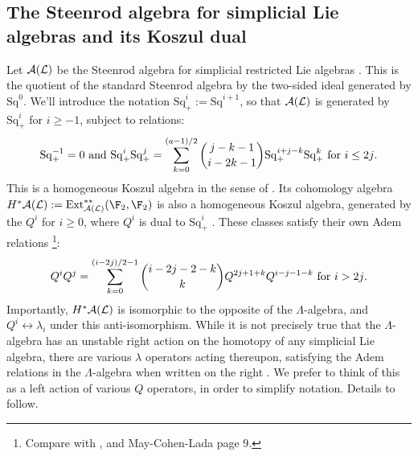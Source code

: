 \documentclass[11pt]{article}
\newcommand{\LambdaOp}{Q}
\newcommand{\SqShift}{\Sq_{+}}
\newcommand{\Sq}{\mathrm{Sq}}
\newcommand{\LieSteen}{\calA(\calL)}
\begin{document}
\begin{SteenrodAlgebrasAndTheirKoszulDuals}
\subsection*{The Steenrod algebra for simplicial Lie algebras and its Koszul dual}
Let  $\LieSteen$ be the Steenrod algebra for simplicial restricted Lie algebras \cite[\S7]{PriddySimplicialLie.pdf}. This is the quotient of the standard Steenrod algebra by the two-sided ideal generated by $\Sq^0$. We'll introduce the notation $\SqShift^i:=\Sq^{i+1}$, so that $\LieSteen$ is generated by $\SqShift^i$ for $i\geq-1$, subject to relations:
\[\SqShift^{-1}=0\textup{ and }\SqShift^i\SqShift^j=\sum_{k=0}^{(a-1)/2}{j-k-1\choose i-2k-1}\SqShift^{i+j-k}\SqShift^k\textup{\ for $i\leq2j$.}\]
This is a homogeneous Koszul algebra in the sense of \cite{PriddyKoszul.pdf}. Its cohomology algebra $H^*\LieSteen:=\Ext_{\LieSteen}^{**}(\F_2,\F_2)$ is also a homogeneous Koszul algebra, generated by the $\LambdaOp^i$ for $i\geq0$, where $\LambdaOp^i$ is dual to $\SqShift^i$ \cite[\S8]{PriddySimplicialLie.pdf}. These classes satisfy their own Adem relations%
\footnote{Compare with \cite[p.143]{Miller-infDeloopSS.pdf}, and May-Cohen-Lada page 9.}:
\[\LambdaOp^i\LambdaOp^j=\sum_{k=0}^{(i-2j)/2-1}{i-2j-2-k\choose k}\LambdaOp^{2j+1+k}\LambdaOp^{i-j-1-k}\textup{\ for $i>2j$.}\]
Importantly, $H^*\LieSteen$ is isomorphic to the opposite of the $\Lambda$-algebra, and $\LambdaOp^i\longleftrightarrow\lambda_i$ under this anti-isomorphism. While it is not precisely true that the $\Lambda$-algebra has an unstable right action on the homotopy of any simplicial Lie algebra, there are various $\lambda$ operators acting thereupon, satisfying the Adem relations in the $\Lambda$-algebra when written on the right \cite[Prop 8.6]{CurtisSimplicialHtpy.pdf}. We prefer to think of this as a left action of various $\LambdaOp$ operators, in order to simplify notation. Details to follow.


\end{SteenrodAlgebrasAndTheirKoszulDuals}
\end{document}

